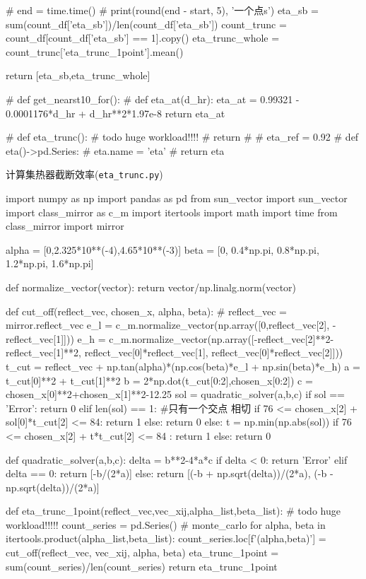 \documentclass{article}
\numberwithin{equation}{subsection}
\begin{document}
\begin{python}
    # end = time.time()
    # print(round(end - start, 5), '一个点s')
    eta_sb = sum(count_df['eta_sb'])/len(count_df['eta_sb'])
    count_trunc = count_df[count_df['eta_sb'] == 1].copy()
    eta_trunc_whole = count_trunc['eta_trunc_1point'].mean()

    return [eta_sb,eta_trunc_whole]

# def get_nearst10_for():
#
def eta_at(d_hr):
    eta_at = 0.99321 - 0.0001176*d_hr + d_hr**2*1.97e-8
    return eta_at

# def eta_trunc(): # todo huge workload!!!!
#     return
#
# eta_ref = 0.92
# def eta()->pd.Series:
#     eta.name = 'eta'
#     return eta
\end{python}

计算集热器截断效率(\verb|eta_trunc.py|)
\begin{python}
import numpy as np
import pandas as pd
from sun_vector import sun_vector
import class_mirror as c_m
import itertools
import math
import time
from class_mirror import mirror

alpha = [0,2.325*10**(-4),4.65*10**(-3)]
beta = [0, 0.4*np.pi, 0.8*np.pi, 1.2*np.pi, 1.6*np.pi]

def normalize_vector(vector):
    return vector/np.linalg.norm(vector)

def cut_off(reflect_vec, chosen_x, alpha, beta):
    # reflect_vec = mirror.reflect_vec
    e_l = c_m.normalize_vector(np.array([0,reflect_vec[2], -reflect_vec[1]]))
    e_h = c_m.normalize_vector(np.array([-reflect_vec[2]**2-reflect_vec[1]**2, reflect_vec[0]*reflect_vec[1], reflect_vec[0]*reflect_vec[2]]))
    t_cut = reflect_vec + np.tan(alpha)*(np.cos(beta)*e_l + np.sin(beta)*e_h)
    a = t_cut[0]**2 + t_cut[1]**2
    b = 2*np.dot(t_cut[0:2],chosen_x[0:2])
    c = chosen_x[0]**2+chosen_x[1]**2-12.25
    sol = quadratic_solver(a,b,c)
    if sol == 'Error':
        return 0
    elif len(sol) == 1: #只有一个交点 相切
        if 76 <= chosen_x[2] + sol[0]*t_cut[2] <= 84:
            return 1
        else:
            return 0
    else:
        t = np.min(np.abs(sol))
        if 76 <= chosen_x[2] + t*t_cut[2] <= 84 :
            return 1
        else:
            return 0



def quadratic_solver(a,b,c):
    delta = b**2-4*a*c
    if delta < 0:
        return 'Error'
    elif delta == 0:
        return [-b/(2*a)]
    else:
        return [(-b + np.sqrt(delta))/(2*a), (-b - np.sqrt(delta))/(2*a)]

def eta_trunc_1point(reflect_vec,vec_xij,alpha_list,beta_list): # todo huge workload!!!!!
    count_series = pd.Series() # monte_carlo
    for alpha, beta in itertools.product(alpha_list,beta_list):
        count_series.loc[f'({alpha},{beta})'] = cut_off(reflect_vec, vec_xij, alpha, beta)
    eta_trunc_1point = sum(count_series)/len(count_series)
    return eta_trunc_1point

\end{python}
\end{document}

